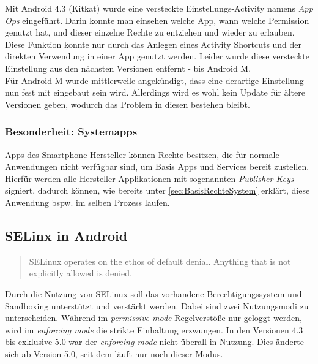 	Mit Android 4.3 (Kitkat) wurde eine versteckte Einstellungs-Activity namens \textit{App Ops} eingeführt. Darin konnte man einsehen welche App, wann welche Permission genutzt hat, und dieser einzelne Rechte zu entziehen und wieder zu erlauben. Diese Funktion konnte nur durch das Anlegen eines Activity Shortcuts und der direkten Verwendung in einer App genutzt werden. Leider wurde diese versteckte Einstellung aus den nächsten Versionen entfernt - bis Android M. \cite{HiddenActivity} \\
	Für Android M wurde mittlerweile angekündigt, dass eine derartige Einstellung nun fest mit eingebaut sein wird.
	Allerdings wird es wohl kein Update für ältere Versionen geben, wodurch das Problem in diesen bestehen bleibt.
	
	\subsubsection{Besonderheit: Systemapps}
	Apps des Smartphone Hersteller können Rechte besitzen, die für normale Anwendungen nicht verfügbar sind, um Basis Apps und Services bereit zustellen. Hierfür werden alle Hersteller Applikationen mit sogenannten \textit{Publisher Keys} signiert, dadurch können, wie bereits unter \ref{sec:BasisRechteSystem} erklärt, diese Anwendung bspw. im selben Prozess laufen.
	
	\subsection{SELinx in Android}
	\begin{quote}
	SELinux operates on the ethos of default denial. Anything that is not explicitly allowed is denied.\cite{SELinuxAndroid}
	\end{quote}
	Durch die Nutzung von SELinux soll das vorhandene Berechtigungssystem und Sandboxing unterstützt und verstärkt werden. Dabei sind zwei Nutzungsmodi zu unterscheiden. Während im \textit{permissive mode} Regelverstöße nur geloggt werden, wird im \textit{enforcing mode} die strikte Einhaltung erzwungen. In den Versionen 4.3 bis exklusive 5.0 war der \textit{enforcing mode} nicht überall in Nutzung. Dies änderte sich ab Version 5.0, seit dem läuft nur noch dieser Modus.
	 
	
	

	